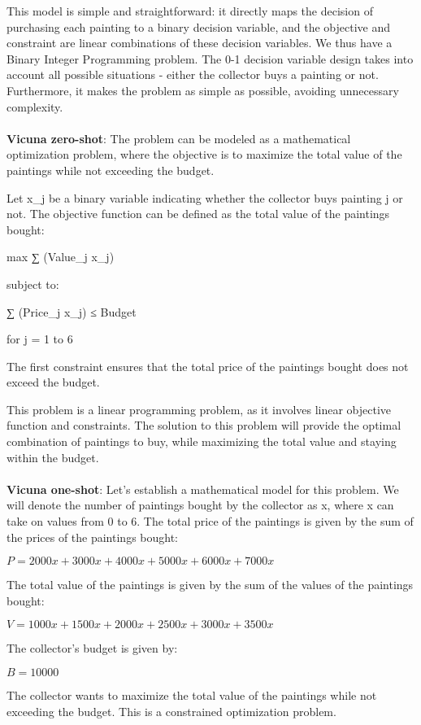 \documentclass{article}%
\begin{document}
This model is simple and straightforward: it directly maps the decision of purchasing each painting to a binary decision variable, and the objective and constraint are linear combinations of these decision variables. We thus have a Binary Integer Programming problem. The 0-1 decision variable design takes into account all possible situations - either the collector buys a painting or not. Furthermore, it makes the problem as simple as possible, avoiding unnecessary complexity.\\\\%
\textbf{Vicuna zero-shot}: The problem can be modeled as a mathematical optimization problem, where the objective is to maximize the total value of the paintings while not exceeding the budget.

Let x\_j be a binary variable indicating whether the collector buys painting j or not. The objective function can be defined as the total value of the paintings bought:

max ∑ (Value\_j \* x\_j)

subject to:

∑ (Price\_j \* x\_j) ≤ Budget

for j = 1 to 6

The first constraint ensures that the total price of the paintings bought does not exceed the budget.

This problem is a linear programming problem, as it involves linear objective function and constraints. The solution to this problem will provide the optimal combination of paintings to buy, while maximizing the total value and staying within the budget.\\\\%
\textbf{Vicuna one-shot}: Let's establish a mathematical model for this problem. We will denote the number of paintings bought by the collector as x, where x can take on values from 0 to 6. The total price of the paintings is given by the sum of the prices of the paintings bought:

$P = 2000x + 3000x + 4000x + 5000x + 6000x + 7000x$

The total value of the paintings is given by the sum of the values of the paintings bought:

$V = 1000x + 1500x + 2000x + 2500x + 3000x + 3500x$

The collector's budget is given by:

$B = 10000$

The collector wants to maximize the total value of the paintings while not exceeding the budget. This is a constrained optimization problem.
\end{document}
